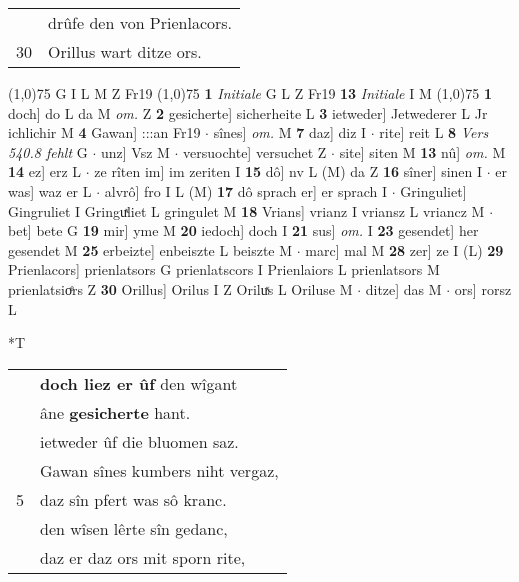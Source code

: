 \documentclass[8pt,a4paper,notitlepage]{article}
\begin{document}
\begin{table}[ht]
\begin{minipage}[t]{0.5\linewidth}
\begin{tabular}{rl}
 & drûfe den von Prienlacors.\\ 
30 & Orillus wart ditze ors.\\ 
\end{tabular}
\scriptsize
\line(1,0){75} \newline
G I L M Z Fr19 \newline
\line(1,0){75} \newline
\textbf{1} \textit{Initiale} G L Z Fr19  \textbf{13} \textit{Initiale} I M  \newline
\line(1,0){75} \newline
\textbf{1} doch] do L da M \textit{om.} Z \textbf{2} gesicherte] sicherheite L \textbf{3} ietweder] Jetwederer L Jr ichlichir M \textbf{4} Gawan] :::an Fr19  $\cdot$ sînes] \textit{om.} M \textbf{7} daz] diz I  $\cdot$ rite] reit L \textbf{8} \textit{Vers 540.8 fehlt} G   $\cdot$ unz] Vsz M  $\cdot$ versuochte] versuchet Z  $\cdot$ site] siten M \textbf{13} nû] \textit{om.} M \textbf{14} ez] erz L  $\cdot$ ze rîten im] im zeriten I \textbf{15} dô] nv L (M) da Z \textbf{16} sîner] sinen I  $\cdot$ er was] waz er L  $\cdot$ alvrô] fro I L (M) \textbf{17} dô sprach er] er sprach I  $\cdot$ Gringuliet] Gingruliet I Gringuͯliet L gringulet M \textbf{18} Vrians] vrianz I vriansz L vriancz M  $\cdot$ bet] bete G \textbf{19} mir] yme M \textbf{20} iedoch] doch I \textbf{21} sus] \textit{om.} I \textbf{23} gesendet] her gesendet M \textbf{25} erbeizte] enbeiszte L beiszte M  $\cdot$ marc] mal M \textbf{28} zer] ze I (L) \textbf{29} Prienlacors] prienlatsors G prienlatscors I Prienlaiors L prienlatsors M prienlatsioͤrs Z \textbf{30} Orillus] Orilus I Z Oriluͯs L Oriluse M  $\cdot$ ditze] das M  $\cdot$ ors] rorsz L \newline
\end{minipage}
\hspace{0.5cm}
\begin{minipage}[t]{0.5\linewidth}
\small
\begin{center}*T
\end{center}
\begin{tabular}{rl}
 & \textbf{doch liez er ûf} den wîgant\\ 
 & âne \textbf{gesicherte} hant.\\ 
 & ietweder ûf die bluomen saz.\\ 
 & Gawan sînes kumbers niht vergaz,\\ 
5 & daz sîn pfert was sô kranc.\\ 
 & den wîsen lêrte sîn gedanc,\\ 
 & daz er daz ors mit sporn rite,\\ 

\end{tabular}
\end{minipage}
\end{table}
\end{document}
